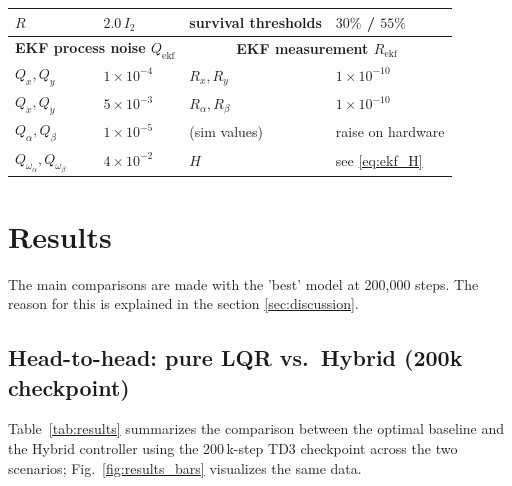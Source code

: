\documentclass[conference]{IEEEtran}
\begin{document}
\begin{table}[t]
\begin{tabular}{@{}l l@{\quad}|@{\quad}l l@{}}
$R$                       & $2.0\,I_2$                    & survival thresholds      & $30\%$ / $55\%$ \\
\midrule
\multicolumn{2}{c}{\textbf{EKF process noise $Q_{\text{ekf}}$}} & \multicolumn{2}{c}{\textbf{EKF measurement $R_{\text{ekf}}$}} \\
\midrule
$Q_{x},Q_{y}$             & $1\!\times\!10^{-4}$          & $R_{x},R_{y}$            & $1\!\times\!10^{-10}$ \\
$Q_{\dot x},Q_{\dot y}$   & $5\!\times\!10^{-3}$          & $R_\alpha,R_\beta$       & $1\!\times\!10^{-10}$ \\
$Q_\alpha,Q_\beta$        & $1\!\times\!10^{-5}$          & (sim values)             & raise on hardware \\
$Q_{\omega_\alpha},Q_{\omega_\beta}$ & $4\!\times\!10^{-2}$ & $H$                    & see \eqref{eq:ekf_H} \\
\bottomrule
\end{tabular}
\end{table}

\section{Results}
\label{sec:results}

The main comparisons are made with the 'best' model at 200,000 steps. The reason for this is explained in the section \ref{sec:discussion}.

\subsection{Head-to-head: pure LQR vs.\ Hybrid (200k checkpoint)}
Table~\ref{tab:results} summarizes the comparison between the optimal
baseline and the Hybrid controller using the $200\,$k-step TD3 checkpoint
across the two scenarios; Fig.~\ref{fig:results_bars} visualizes the same
data.
\end{document}
